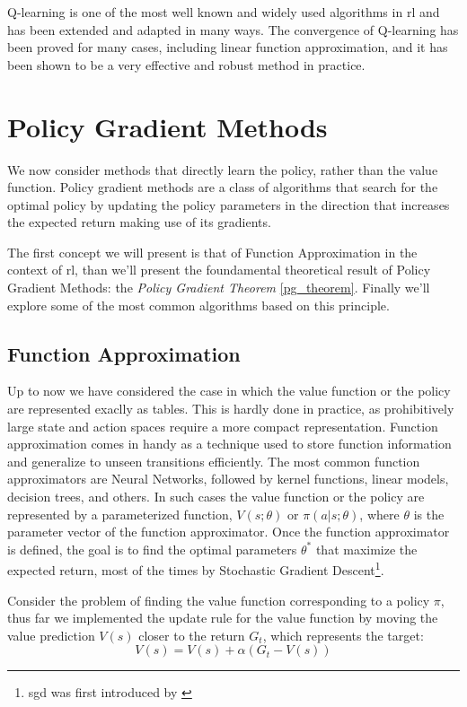 Q-learning is one of the most well known and widely used algorithms in \gls{rl} and has been
extended and adapted in many ways. The convergence of Q-learning has been proved for
many cases, including linear function approximation, and it has been shown to be a very
effective and robust method in practice.

\section{Policy Gradient Methods}
We now consider methods that directly learn the policy, rather than the value function.
Policy gradient methods are a class of algorithms that search for the optimal policy by
updating the policy parameters in the direction that increases the expected return making use of its gradients. 

The first concept we  will present is that of Function Approximation in the context of \gls{rl}, than we'll present the foundamental 
theoretical result of Policy Gradient Methods: the \emph{Policy Gradient Theorem} \ref{pg_theorem}. 
Finally we'll explore some of the most common algorithms based on this principle.  

\subsection{Function Approximation}
Up to now we have considered the case in which the value function or the policy  
are represented exaclly as tables. This is hardly done in practice, as prohibitively large state and action spaces 
require a more compact representation. Function approximation comes in handy as a technique used to store 
function information and generalize to unseen transitions efficiently. The most common function 
approximators are Neural Networks, followed by kernel functions, linear models, decision trees, and others. 
In such cases the value function or the policy are represented by a parameterized function,
$V(s; \theta)$ or $\pi(a|s; \theta)$, where $\theta$ is the parameter vector of the function approximator.
Once the function approximator is defined, the goal is to find the optimal parameters $\theta^*$ that 
maximize the expected return, most of the times by Stochastic Gradient Descent\footnote{\gls{sgd} was first introduced by \cite{10.1214/aoms/1177729586}}.

Consider the problem of finding the value function corresponding to a policy \(\pi\), thus far we 
implemented the update rule for the value function by moving the value prediction $V(s)$ closer to 
the return $G_t$, which represents the target:
$$V(s) = V(s) + \alpha (G_t - V(s))$$

